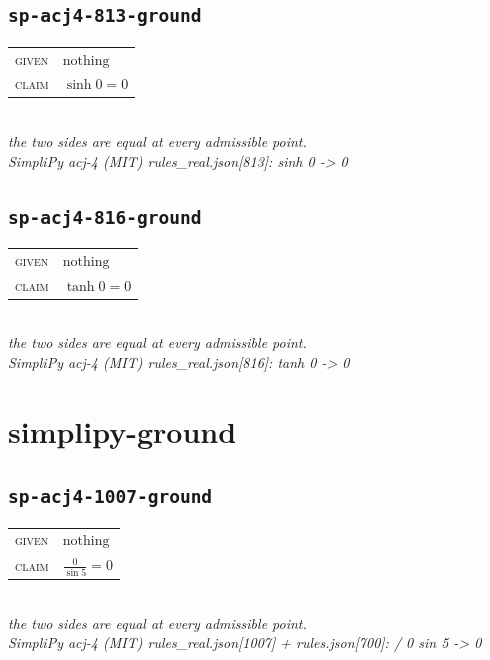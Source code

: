 \documentclass[11pt]{article}
\begin{document}
\subsection*{\texttt{sp-acj4-813-ground}}
\begin{tabular}{@{}l@{\quad}l@{}}
\textsc{given} & $\text{nothing}$ \\[4pt]
\textsc{claim} & $\displaystyle \sinh 0 = 0$ \\
\end{tabular}\\[2pt]
{\small\emph{the two sides are equal at every admissible point.}}\\
\emph{SimpliPy acj-4 (MIT) rules\_real.json[813]: sinh 0  ->  0}\\

\subsection*{\texttt{sp-acj4-816-ground}}
\begin{tabular}{@{}l@{\quad}l@{}}
\textsc{given} & $\text{nothing}$ \\[4pt]
\textsc{claim} & $\displaystyle \tanh 0 = 0$ \\
\end{tabular}\\[2pt]
{\small\emph{the two sides are equal at every admissible point.}}\\
\emph{SimpliPy acj-4 (MIT) rules\_real.json[816]: tanh 0  ->  0}\\

\section*{simplipy-ground}
\subsection*{\texttt{sp-acj4-1007-ground}}
\begin{tabular}{@{}l@{\quad}l@{}}
\textsc{given} & $\text{nothing}$ \\[4pt]
\textsc{claim} & $\displaystyle \frac{0}{\sin 5} = 0$ \\
\end{tabular}\\[2pt]
{\small\emph{the two sides are equal at every admissible point.}}\\
\emph{SimpliPy acj-4 (MIT) rules\_real.json[1007] + rules.json[700]: / 0 sin 5  ->  0}\\
\end{document}
